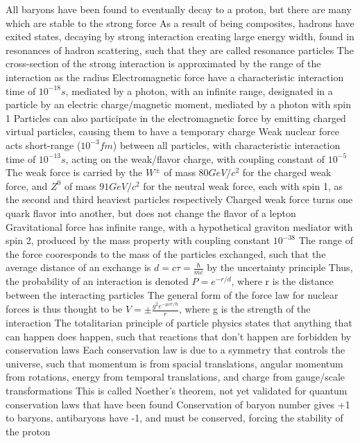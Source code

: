 \documentclass[11 pt, twoside]{article}
\newenvironment{outline*}
{
	\begin{outline}[enumerate]
	}
	{\end{outline}
}
\begin{document}
\begin{outline*}
		\3 All baryons have been found to eventually decay to a proton, but there are many which are stable to the strong force
		\3 As a result of being composites, hadrons have exited states, decaying by strong interaction creating large energy width, found in resonances of hadron scattering, such that they are called resonance particles
		\3 The cross-section of the strong interaction is approximated by the range of the interaction as the radius
	\2 Electromagnetic force have a characteristic interaction time of $10^{-18} s$, mediated by a photon, with an infinite range, designated in a particle by an electric charge/magnetic moment, mediated by a photon with spin 1
		\3 Particles can also participate in the electromagnetic force by emitting charged virtual particles, causing them to have a temporary charge
	\2 Weak nuclear force acts short-range ($10^{-3} fm$) between all particles, with characteristic interaction time of $10^{-13} s$, acting on the weak/flavor charge, with coupling constant of $10^{-5}$
		\3 The weak force is carried by the $W^{\pm}$ of mass $80 GeV/c^2$ for the charged weak force, and $Z^0$ of mass $91 GeV/c^2$ for the neutral weak force, each with spin 1, as the second and third heaviest particles respectively
		\3 Charged weak force turns one quark flavor into another, but does not change the flavor of a lepton
	\2 Gravitational force has infinite range, with a hypothetical graviton mediator with spin 2, produced by the mass property with coupling constant $10^{-38}$
	\2 The range of the force cooresponds to the mass of the particles exchanged, such that the average distance of an exchange is $d = c\tau = \frac{\hbar}{mc}$ by the uncertainty principle
		\3 Thus, the probability of an interaction is denoted $P = e^{-r/d}$, where r is the distance between the interacting particles
		\3 The general form of the force law for nuclear forces is thus thought to be $V = \pm \frac{g^2e^{-\mu cr/\hbar}}{r}$, where g is the strength of the interaction
\1 The totalitarian principle of particle physics states that anything that can happen does happen, such that reactions that don't happen are forbidden by conservation laws
	\2 Each conservation law is due to a symmetry that controls the universe, such that momentum is from spacial translations, angular momentum from rotations, energy from temporal translations, and charge from gauge/scale transformations
		\3 This is called Noether's theorem, not yet validated for quantum conservation laws that have been found
	\2 Conservation of baryon number gives +1 to baryons, antibaryons have -1, and must be conserved, forcing the stability of the proton

\end{outline*}
\end{document}
